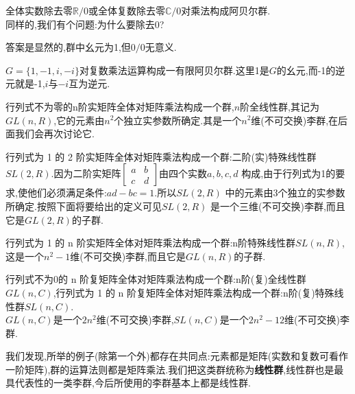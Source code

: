 \begin{example}
	全体实数除去零$\mathbb{R}/0$或全体复数除去零$\mathbb{C}/0$对乘法构成阿贝尔群.\\
	同样的,我们有个问题:为什么要除去0?
\end{example}
\begin{solution}
	答案是显然的,群中幺元为1,但$0/0$无意义.
\end{solution}
\begin{example}
	$G =\{1,-1,i,-i\}$对复数乘法运算构成一有限阿贝尔群.这里1是$G$的幺元,而-1的逆元就是-1,$i$与$-i$互为逆元.
\end{example}
\begin{example}
	行列式不为零的n阶实矩阵全体对矩阵乘法构成一个群,$n$阶全线性群,其记为$GL(n,R)$,它的元素由$n^2$个独立实参数所确定.其是一个$n^2$维(不可交换)李群,在后面我们会再次讨论它.
\end{example}
\begin{example}
	行列式为 1 的 2 阶实矩阵全体对矩阵乘法构成一个群:二阶(实)特殊线性群$SL(2,R)$.因为二阶实矩阵$\begin{bmatrix}a&b\\c&d\end{bmatrix}$由四个实数$a,b,c,d$ 构成,由于行列式为1的要求,使他们必须满足条件:$ad-bc=1$.所以$SL(2,R)$ 中的元素由3个独立的实参数所确定.按照下面将要给出的定义可见$SL(2,R)$ 是一个三维(不可交换)李群,而且它是$GL(2,R)$的子群.
\end{example}
\begin{example}
	行列式为 1 的 n 阶实矩阵全体对矩阵乘法构成一个群:n阶特殊线性群$SL(n,R)$,这是一个$n^2-1$维(不可交换)李群,而且它是$GL(n,R)$的子群.
\end{example}
\begin{example}
	行列式不为0的 n 阶复矩阵全体对矩阵乘法构成一个群:n阶(复)全线性群$GL(n,C)$,行列式为 1 的 n 阶复矩阵全体对矩阵乘法构成一个群:n阶(复)特殊线性群$SL(n,C)$.\\
	$GL(n,C)$是一个$2n^2$维(不可交换)李群,$SL(n,C)$是一个$2n^2-12$维(不可交换)李群.
\end{example}

我们发现,所举的例子(除第一个外)都存在共同点:元素都是矩阵(实数和复数可看作一阶矩阵),群的运算法则都是矩阵乘法.我们把这类群统称为\textbf{线性群},线性群也是最具代表性的一类李群,今后所使用的李群基本上都是线性群.

